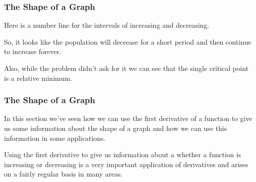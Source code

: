 \documentclass{beamer}
\begin{document}
\begin{frame} 
	\frametitle{The Shape of a Graph}
	

Here is a number line for the intervals of increasing and decreasing.

So, it looks like the population will decrease for a short period and then continue to increase forever.

Also, while the problem didn’t ask for it we can see that  the single critical point is a relative minimum.

\end{frame}
\begin{frame} 
	\frametitle{The Shape of a Graph}
	
In this section we’ve seen how we can use the first derivative of a function to give us some information about the shape of a graph and how we can use this information in some applications.

Using the first derivative to give us information about a whether a function is increasing or decreasing is a very important application of derivatives and arises on a fairly regular basis in many areas.
\end{frame}
\end{document}
